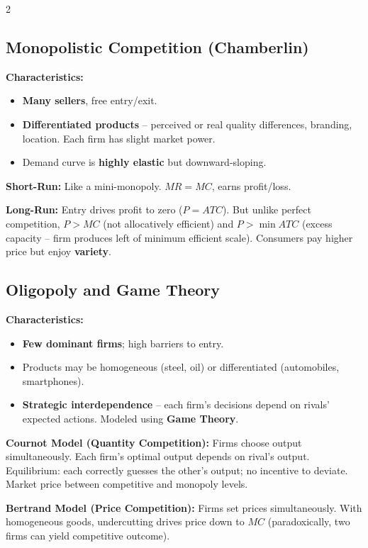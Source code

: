 \documentclass[10pt,a4paper]{article}
\begin{document}
\begin{multicols}{2}
\subsection*{Monopolistic Competition (Chamberlin)}
\textbf{Characteristics:}
\begin{itemize}[leftmargin=*,nosep]
    \item \textbf{Many sellers}, free entry/exit.
    \item \textbf{Differentiated products} -- perceived or real quality differences, branding, location. Each firm has slight market power.
    \item Demand curve is \textbf{highly elastic} but downward-sloping.
\end{itemize}

\textbf{Short-Run:} Like a mini-monopoly. $MR = MC$, earns profit/loss.

\textbf{Long-Run:} Entry drives profit to zero ($P = ATC$). But unlike perfect competition, $P > MC$ (not allocatively efficient) and $P > \min ATC$ (excess capacity -- firm produces left of minimum efficient scale). Consumers pay higher price but enjoy \textbf{variety}.

\subsection*{Oligopoly and Game Theory}
\textbf{Characteristics:}
\begin{itemize}[leftmargin=*,nosep]
    \item \textbf{Few dominant firms}; high barriers to entry.
    \item Products may be homogeneous (steel, oil) or differentiated (automobiles, smartphones).
    \item \textbf{Strategic interdependence} -- each firm's decisions depend on rivals' expected actions. Modeled using \textbf{Game Theory}.
\end{itemize}

\textbf{Cournot Model (Quantity Competition):} Firms choose output simultaneously. Each firm's optimal output depends on rival's output. Equilibrium: each correctly guesses the other's output; no incentive to deviate. Market price between competitive and monopoly levels.

\textbf{Bertrand Model (Price Competition):} Firms set prices simultaneously. With homogeneous goods, undercutting drives price down to $MC$ (paradoxically, two firms can yield competitive outcome).


\end{multicols}
\end{document}
